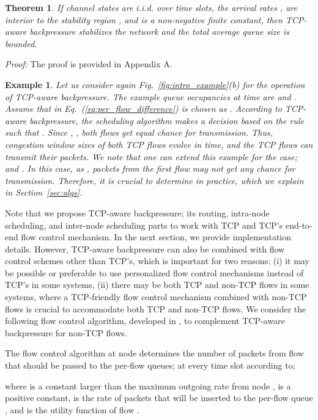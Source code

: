 \documentclass[conference]{IEEEtran}
\newtheorem{theorem}{Theorem}
\newtheorem{example}{Example}
\begin{document}
\begin{theorem}\label{theorem1}
If channel states are i.i.d. over time slots, the arrival rates ,  are interior to the stability region , and  is a non-negative finite constant, then TCP-aware backpressure stabilizes the network and the total average queue size is bounded.
\end{theorem}
{\em Proof:} The proof is provided in Appendix A. \hfill 
\begin{example}\label{ex2}
Let us consider again Fig.~\ref{fig:intro_example}(b) for the operation of TCP-aware backpressure. The example queue occupancies at time  are  and . Assume that  in Eq.~(\ref{eq:per_flow_difference}) is chosen as . According to TCP-aware backpressure, the scheduling algorithm makes a decision based on the rule   such that . Since    , , both flows get equal chance for transmission. Thus, congestion window sizes of both TCP flows evolve in time, and the TCP flows can transmit their packets. We note that one can extend this example for the case;  and . In this case, as , packets from the first flow may not get any chance for transmission. Therefore, it is crucial to determine  in practice, which we explain in Section~\ref{sec:algs}. \hfill 
\end{example}

Note that we propose TCP-aware backpressure; its routing, intra-node scheduling, and inter-node scheduling parts to work with TCP and TCP's end-to-end flow control mechanism. In the next section, we provide implementation details. However, TCP-aware backpressure can also be combined with flow control schemes other than TCP's, which is important for two reasons: (i) it may be possible or preferable to use personalized flow control mechanisms instead of TCP's in some systems, (ii) there may be both TCP and non-TCP flows in some systems, where a TCP-friendly flow control mechanism combined with non-TCP flows is crucial to accommodate both TCP and non-TCP flows. We consider the following flow control algorithm, developed in \cite{neely_mod}, to complement TCP-aware backpressure for non-TCP flows.

The flow control algorithm at node  determines the number of packets from flow  that should be passed to the per-flow queues;  at every time slot  according to;

 where  is a constant larger than the maximum outgoing rate from node ,  is a positive constant,  is the rate of packets that will be inserted to the per-flow queue , and  is the utility function of flow .
\end{document}

